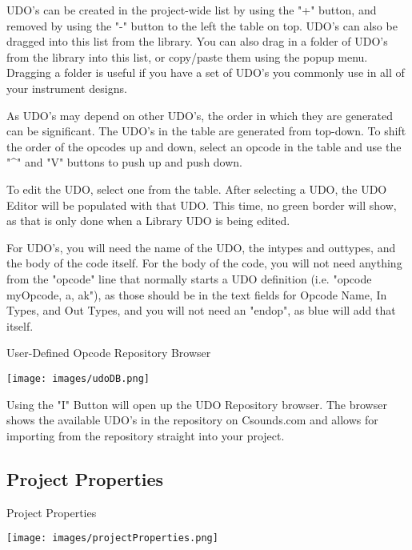 UDO's can be created in the project-wide list by using the "+" button,
and removed by using the "-" button to the left the table on top. UDO's
can also be dragged into this list from the library. You can also drag
in a folder of UDO's from the library into this list, or copy/paste them
using the popup menu. Dragging a folder is useful if you have a set of
UDO's you commonly use in all of your instrument designs.

As UDO's may depend on other UDO's, the order in which they are
generated can be significant. The UDO's in the table are generated from
top-down. To shift the order of the opcodes up and down, select an
opcode in the table and use the "\^{}" and "V" buttons to push up and
push down.

To edit the UDO, select one from the table. After selecting a UDO, the
UDO Editor will be populated with that UDO. This time, no green border
will show, as that is only done when a Library UDO is being edited.

For UDO's, you will need the name of the UDO, the intypes and outtypes,
and the body of the code itself. For the body of the code, you will not
need anything from the "opcode" line that normally starts a UDO
definition (i.e. "opcode myOpcode, a, ak"), as those should be in the
text fields for Opcode Name, In Types, and Out Types, and you will not
need an "endop", as blue will add that itself.

User-Defined Opcode Repository Browser

\texttt{[image: images/udoDB.png]}

Using the "I" Button will open up the UDO Repository browser. The
browser shows the available UDO's in the repository on Csounds.com and
allows for importing from the repository straight into your project.

\subsection{Project Properties}\label{projectProperties}

Project Properties

\texttt{[image: images/projectProperties.png]}

